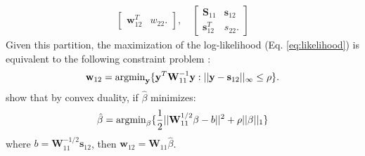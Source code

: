 \begin{DoubleSpace*}
\begin{align}
\begin{bmatrix}
\textbf{w}_{12}^T & w_{22}.
\end{bmatrix}, \quad
\begin{bmatrix}
\textbf{S}_{11} & \textbf{s}_{12} \\
\textbf{s}_{12}^T & s_{22}.
\end{bmatrix}
\end{align}  
Given this partition, the maximization of the log-likelihood (Eq. \ref{eq:likelihood}) is equivalent to the following constraint problem \cite{banerjee2008}:
\begin{align}
\textbf{w}_{12}=\operatorname{argmin}_{\textbf{y}} \{ \textbf{y}^T \textbf{W}_{11} ^{-1} \textbf{y} : ||\textbf{y}-\textbf{s}_{12}||_{\infty} \leq \rho \}.
\end{align}
\cite{banerjee2008} show that by convex duality, if $\hat{\beta}$ minimizes:
\begin{align}
\hat{\beta}=\operatorname{argmin}_{\beta} \{\frac{1}{2} ||\textbf{W}_{11}^{1/2}\beta-b||^2 +\rho ||\beta||_1 \}
\label{eq:dual}
\end{align}
where $b=\textbf{W}_{11}^{-1/2} \textbf{s}_{12}$, then $\textbf{w}_{12}=\textbf{W}_{11} \hat{\beta}$.


\end{DoubleSpace*}
